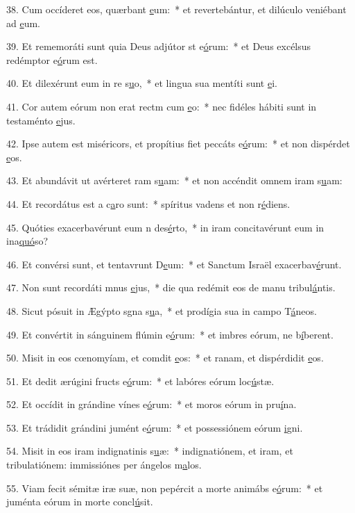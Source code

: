 38. Cum occíderet eos, quærbant \uline{e}um:~* et revertebántur, et dilúculo veniébant ad \uline{e}um.\par 
39. Et rememoráti sunt quia Deus adjútor st e\uline{ó}rum:~* et Deus excélsus redémptor e\uline{ó}rum est.\par 
40. Et dilexérunt eum in re s\uline{u}o,~* et lingua sua mentíti sunt \uline{e}i.\par 
41. Cor autem eórum non erat rectm cum \uline{e}o:~* nec fidéles hábiti sunt in testaménto \uline{e}jus.\par 
42. Ipse autem est miséricors, et propítius fiet peccáts e\uline{ó}rum:~* et non dispérdet \uline{e}os.\par 
43. Et abundávit ut avérteret ram s\uline{u}am:~* et non accéndit omnem iram s\uline{u}am:\par 
44. Et recordátus est a c\uline{a}ro sunt:~* spíritus vadens et non r\uline{é}diens.\par 
45. Quóties exacerbavérunt eum n des\uline{é}rto,~* in iram concitavérunt eum in ina\uline{quó}so?\par 
46. Et convérsi sunt, et tentavrunt D\uline{e}um:~* et Sanctum Israël exacerbav\uline{é}runt.\par 
47. Non sunt recordáti mnus \uline{e}jus,~* die qua redémit eos de manu tribul\uline{á}ntis.\par 
48. Sicut pósuit in Ægýpto sgna s\uline{u}a,~* et prodígia sua in campo T\uline{á}neos.\par 
49. Et convértit in sánguinem flúmin e\uline{ó}rum:~* et imbres eórum, ne b\uline{í}berent.\par 
50. Misit in eos cœnomyíam, et comdit \uline{e}os:~* et ranam, et dispérdidit \uline{e}os.\par 
51. Et dedit ærúgini fructs e\uline{ó}rum:~* et labóres eórum loc\uline{ú}stæ.\par 
52. Et occídit in grándine vínes e\uline{ó}rum:~* et moros eórum in pru\uline{í}na.\par 
53. Et trádidit grándini jumént e\uline{ó}rum:~* et possessiónem eórum \uline{i}gni.\par 
54. Misit in eos iram indignatinis s\uline{u}æ:~* indignatiónem, et iram, et tribulatiónem: immissiónes per ángelos m\uline{a}los.\par 
55. Viam fecit sémitæ iræ suæ, non pepércit a morte animábs e\uline{ó}rum:~* et juménta eórum in morte concl\uline{ú}sit.\par 
